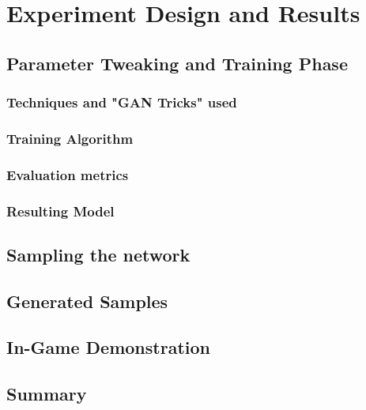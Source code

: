 \chapter{Experiment Design and Results}
\section{Parameter Tweaking and Training Phase}
\subsection{Techniques and "GAN Tricks" used}
\subsection{Training Algorithm}
\subsection{Evaluation metrics}
\subsection{Resulting Model}
\section{Sampling the network}
\section{Generated Samples}
\section{In-Game Demonstration}
\section{Summary}